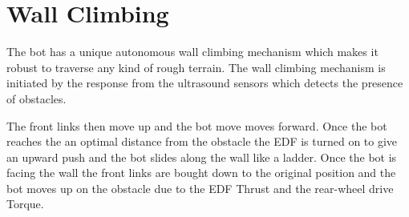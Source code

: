 \section{Wall Climbing }
The bot has a unique autonomous wall climbing mechanism which makes it robust to traverse any kind of rough terrain. The wall climbing mechanism is initiated by the response from the ultrasound sensors which detects the presence of obstacles.

The front links then move up and the bot move moves forward. Once the bot reaches the an optimal distance from the obstacle the EDF is turned on to give an upward push and the bot slides along the wall like a ladder. Once the bot is facing the wall the front links are bought down to the original position and the bot moves up on the obstacle due to the EDF Thrust and the rear-wheel drive Torque. 
